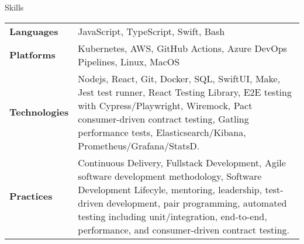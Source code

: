 \begin{section}{Skills}
  \begin{tabularx}{\linewidth}{@{}l X@{}}
    \textbf{Languages} &\small{JavaScript, TypeScript, Swift, Bash} \\
    \textbf{Platforms} &\small{Kubernetes, AWS, GitHub Actions, Azure DevOps Pipelines, Linux, MacOS} \\
    \textbf{Technologies} &\small{Nodejs, React, Git, Docker, SQL, SwiftUI, Make, Jest test runner, React Testing Library, E2E testing with Cypress/Playwright, Wiremock, Pact consumer-driven contract testing, Gatling performance tests, Elasticsearch/Kibana, Prometheus/Grafana/StatsD.} \\
    \textbf{Practices} &\small{Continuous Delivery, Fullstack Development, Agile software development methodology, Software Development Lifecyle, mentoring, leadership, test-driven development, pair programming, automated testing including unit/integration, end-to-end, performance, and consumer-driven contract testing.} \\
  \end{tabularx}
\end{section}
